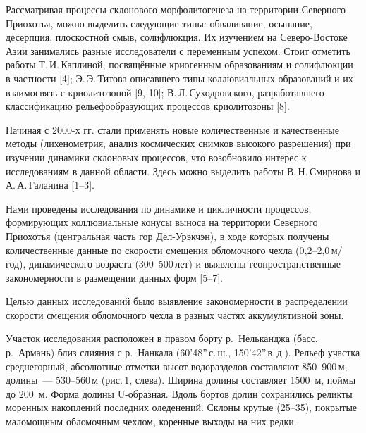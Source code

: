  

\makeProcTitleNewLine
{}

Рассматривая процессы склонового морфолитогенеза на территории Северного Приохотья,
можно выделить следующие типы: обваливание, осыпание, десерпция, плоскостной смыв, солифлюкция.
Их изучением на Северо-Востоке Азии занимались разные исследователи с переменным успехом.
Стоит отметить работы Т.\,И.\,Каплиной, посвящённые криогенным образованиям
и солифлюкции в частности [4]; Э.\,Э.\,Титова описавшего типы коллювиальных образований
и их взаимосвязь с криолитозоной [9, 10]; В.\,Л.\,Суходровского, разработавшего классификацию рельефообразующих процессов криолитозоны [8].

Начиная с 2000-х гг. стали применять новые количественные и качественные методы (лихенометрия, анализ космических снимков высокого разрешения) при изучении динамики склоновых процессов,
что возобновило интерес к исследованиям в данной области. Здесь можно выделить работы В.\,Н.\,Смирнова и А.\,А.\,Галанина [1--3].

Нами проведены исследования по динамике и цикличности процессов, формирующих коллювиальные конусы выноса на территории Северного Приохотья (центральная часть гор Дел-Урэкчэн), в ходе которых получены количественные данные по скорости смещения обломочного чехла (0,2--2,0\,м/год), динамического возраста (300--500\,лет) и выявлены геопространственные закономерности в размещении данных форм [5--7].

Целью данных исследований было выявление закономерности в распределении скорости смещения обломочного чехла в разных частях аккумулятивной зоны.

Участок исследования расположен в правом борту р.~Нельканджа (басс. р.~Армань) близ слияния с р.~Нанкала (60’48”\,с.\,ш., 150’42”\,в.\,д.). Рельеф участка среднегорный, абсолютные отметки высот водоразделов составляют 850--900\,м, долины~--- 530--560\,м (рис.\,1, слева). Ширина долины составляет 1500~м, поймы до 200~м. Форма долины U-образная. Вдоль бортов долин сохранились реликты моренных накоплений последних оледенений. Склоны крутые (25--35\dg), покрытые маломощным обломочным чехлом, коренные выходы на них редки.

